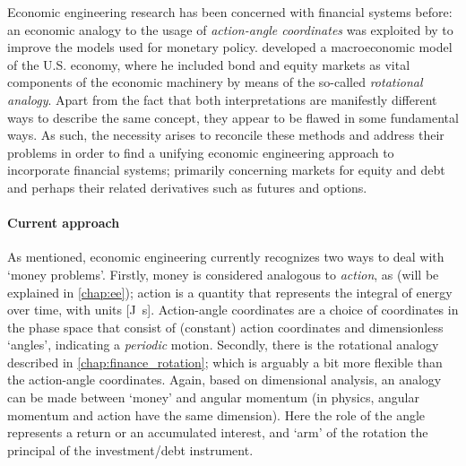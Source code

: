 Economic engineering research has been concerned with financial systems before: an economic analogy to the usage of 
\emph{action-angle coordinates} was exploited by \citet{Vos2019} to improve the models used for monetary policy. \citet{Kruimer2021} developed a macroeconomic model of the U.S. economy, where he included bond and equity markets as vital components of the economic machinery by means of the so-called \emph{rotational analogy}. Apart from the fact that both interpretations are manifestly different ways to describe the same concept, they appear to be flawed in some fundamental ways. As such, the necessity arises to reconcile these methods and address their problems in order to find a unifying economic engineering approach to incorporate financial systems; primarily concerning markets for equity and debt and perhaps their related derivatives such as futures and options. 

\paragraph{Current approach} As mentioned, economic engineering currently recognizes two ways to deal with 
`money problems'. Firstly, money is considered analogous to \emph{action}, as (will be explained in \cref{chap:ee}); action is a quantity that represents the integral of energy over time, with units [\si{\joule \second}]. Action-angle coordinates are a choice of coordinates in the phase space that consist of (constant) action coordinates and dimensionless `angles', indicating a \emph{periodic} motion. Secondly, there is the rotational analogy described in \cref{chap:finance_rotation}; which is arguably a bit more flexible than the action-angle coordinates. Again, based on dimensional analysis, an analogy can be made between `money' and angular momentum (in physics, angular momentum and action have the same dimension). Here the role of the angle represents a return or an accumulated interest, and `arm' of the rotation the principal of the investment/debt instrument.

